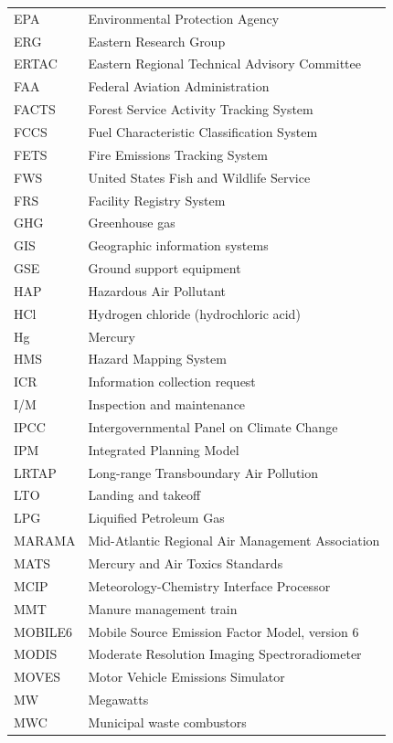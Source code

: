 \documentclass[
  11pt,
  oneside]{book}
\begin{document}
\begin{longtable}{ll}
EPA & Environmental Protection Agency\\
ERG & Eastern Research Group\\
ERTAC & Eastern Regional Technical Advisory Committee\\
\addlinespace
FAA & Federal Aviation Administration\\
FACTS & Forest Service Activity Tracking System\\
FCCS & Fuel Characteristic Classification System\\
FETS & Fire Emissions Tracking System\\
FWS & United States Fish and Wildlife Service\\
\addlinespace
FRS & Facility Registry System\\
GHG & Greenhouse gas\\
GIS & Geographic information systems\\
GSE & Ground support equipment\\
HAP & Hazardous Air Pollutant\\
\addlinespace
HCl & Hydrogen chloride (hydrochloric acid)\\
Hg & Mercury\\
HMS & Hazard Mapping System\\
ICR & Information collection request\\
I/M & Inspection and maintenance\\
\addlinespace
IPCC & Intergovernmental Panel on Climate Change\\
IPM & Integrated Planning Model\\
LRTAP & Long-range Transboundary Air Pollution\\
LTO & Landing and takeoff\\
LPG & Liquified Petroleum Gas\\
\addlinespace
MARAMA & Mid-Atlantic Regional Air Management Association\\
MATS & Mercury and Air Toxics Standards\\
MCIP & Meteorology-Chemistry Interface Processor\\
MMT & Manure management train\\
MOBILE6 & Mobile Source Emission Factor Model, version 6\\
\addlinespace
MODIS & Moderate Resolution Imaging Spectroradiometer\\
MOVES & Motor Vehicle Emissions Simulator\\
MW & Megawatts\\
MWC & Municipal waste combustors\\

\end{longtable}
\end{document}
